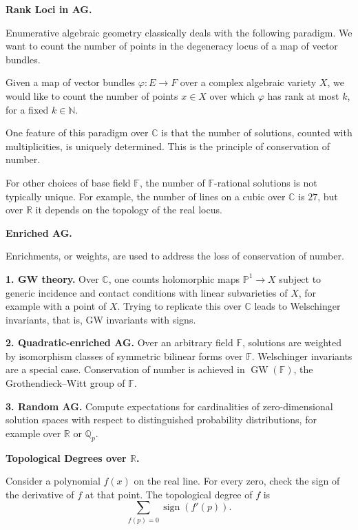 \medskip\noindent
{\bf Rank Loci in AG.}

Enumerative algebraic geometry
classically deals with the following
paradigm.
We want to count the number of points
in the degeneracy locus of a map of
vector bundles.

\medskip\noindent
Given a map of vector bundles
$\varphi:E\to F$ over a complex
algebraic variety $X$, we would like
to count the number of points
$x\in X$ over which $\varphi$ has
rank at most $k$, for a fixed
$k\in\mathbb N$.

\medskip\noindent
One feature of this paradigm over
$\mathbb C$ is that the number of
solutions, counted with
multiplicities, is uniquely
determined.
This is the principle of conservation
of number.

\medskip\noindent
For other choices of base field
$\mathbb F$, the number of
$\mathbb F$-rational solutions is not
typically unique.
For example, the number of lines on a
cubic over $\mathbb C$ is $27$, but
over $\mathbb R$ it depends on the
topology of the real locus.

\medskip\noindent
{\bf Enriched AG.}

Enrichments, or weights, are used to
address the loss of conservation of
number.

\medskip\noindent
{\bf 1. GW theory.}
Over $\mathbb C$, one counts
holomorphic maps
$\mathbb P^1\to X$ subject to generic
incidence and contact conditions
with linear subvarieties of $X$,
for example with a point of $X$.
Trying to replicate this over
$\mathbb C$ leads to Welschinger
invariants, that is, GW invariants
with signs.

\medskip\noindent
{\bf 2. Quadratic-enriched AG.}
Over an arbitrary field $\mathbb F$,
solutions are weighted by
isomorphism classes of symmetric
bilinear forms over $\mathbb F$.
Welschinger invariants are a special
case.
Conservation of number is achieved
in $\operatorname{GW}(\mathbb F)$,
the Grothendieck--Witt group of
$\mathbb F$.

\medskip\noindent
{\bf 3. Random AG.}
Compute expectations for
cardinalities of zero-dimensional
solution spaces with respect to
distinguished probability
distributions, for example over
$\mathbb R$ or $\mathbb Q_p$.

\medskip\noindent
{\bf Topological Degrees over
$\mathbb R$.}

Consider a polynomial $f(x)$ on the
real line.
For every zero, check the sign of the
derivative of $f$ at that point.
The topological degree of $f$ is
\[
\sum_{f(p)=0}\operatorname{sign}(f'(p)).
\]

